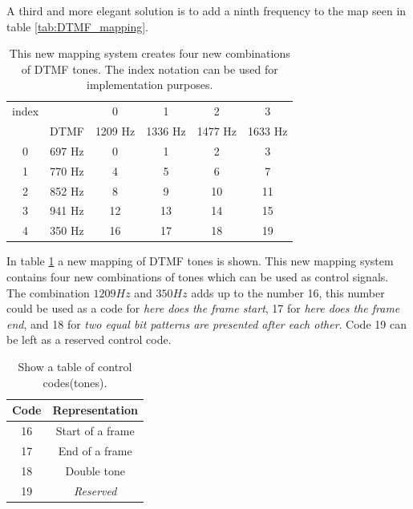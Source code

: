 	A third and more elegant solution is to add a ninth frequency to the map seen in table \ref{tab:DTMF_mapping}.
	
	\begin{table}[htb]
		\begin{center}
			\begin{tabular}{c c|c c c c}
	 		index & & 0 & 1 & 2 & 3 \\
			& DTMF & 1209 Hz & 1336 Hz & 1477 Hz & 1633 Hz \\
			\hline
			0 & 697 Hz & 0 & 1 & 2 & 3 \\
			1 & 770 Hz & 4 & 5 & 6 & 7 \\
			2 & 852 Hz & 8 & 9 & 10 & 11 \\
			3 & 941 Hz & 12 & 13 & 14 & 15 \\
			4 & 350 Hz & 16 & 17 & 18 & 19 \\
			\end{tabular}
		\end{center}
		\caption{This new mapping system creates four new combinations of DTMF tones. The index notation can be used for
		implementation purposes.}
		\label{tab:newDTMF_mapping}
	\end{table}
	
	In table \ref{tab:newDTMF_mapping} a new mapping of DTMF tones is shown. This new mapping system contains four new combinations of tones
	which can be used as control signals. The combination $1209 Hz$ and $350 Hz$ adds up to the number 16, this number could be used as a code for
	\textit{here does the frame start}, 17 for \textit{here does the frame end}, and 18 for \textit{two equal bit patterns are presented after
	each other}. Code 19 can be left as a reserved control code. 
	
	\begin{table}[htb]
		\begin{center}
			\begin{tabular}{|c|c|}
			\hline
			\textbf{Code} & \textbf{Representation}\\
			\hline
			16 & Start of a frame \\
			\hline
			17 & End of a frame \\
			\hline
			18 & Double tone \\
			\hline
			19 & \textit{Reserved} \\
			\hline
			\end{tabular}
		\end{center}
		\caption{Show a table of control codes(tones).}
		\label{tab:physical_control_tones}
	\end{table}
	
